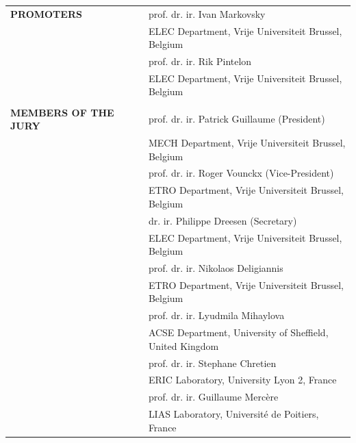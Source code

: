 \documentclass[english, british, BCOR=5mm, DIV=12, fontsize=10pt]{scrbook}
\begin{document}
{	\begin{tabular}{@{}lll@{}}
	\textbf{\small PROMOTERS}		& &	{\small prof. dr. ir. Ivan Markovsky}				\\
				& &		{\footnotesize{}ELEC Department, Vrije Universiteit Brussel, Belgium}\\[0.3em]
				& &	\small prof. dr. ir. Rik Pintelon				\\
				& &		{\footnotesize{}ELEC Department, Vrije Universiteit Brussel, Belgium}	\\[0.3em]
				\\
	\textbf{\small MEMBERS OF THE JURY}	&	&\small prof. dr. ir. Patrick Guillaume (President)		\\
				&	&{\footnotesize{}MECH Department, Vrije Universiteit Brussel, Belgium}	\\[0.3em]
				&	&\small prof. dr. ir. Roger Vounckx (Vice-President)				\\
				&	&{\footnotesize{}ETRO Department, Vrije Universiteit Brussel, Belgium}	\\[0.3em]
				&	&\small dr. ir. Philippe Dreesen (Secretary)					\\
				&	&{\footnotesize{}ELEC Department, Vrije Universiteit Brussel, Belgium}				\\[0.3em]
				&	&\small \color{blue} prof. \color{black} dr. ir. Nikolaos Deligiannis \\
				&	&{\footnotesize{}ETRO Department, Vrije Universiteit Brussel, Belgium} 			\\[0.3em]
				&	&\small prof. dr. ir. Lyudmila Mihaylova 		\\
				&	&{\footnotesize{}ACSE Department, University of Sheffield, United Kingdom} \\
				&	&\small prof. dr. ir. Stephane Chretien  		\\
				&	&{\footnotesize{}ERIC Laboratory, University Lyon 2, France} \\
				&	&\small prof. dr. ir. Guillaume  Merc\`ere 		\\
				&	&{\footnotesize{}LIAS Laboratory, Universit\'e de Poitiers, France} \\
\end{tabular}

}
\end{document}
